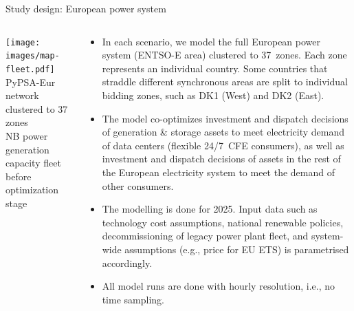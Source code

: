 \begin{frame}{Study design: European power system}
  
  {\footnotesize
  \begin{columns}[T]

  \begin{column}{7cm}
  \centering
  \vspace{0.5cm}
  \texttt{[image: images/map-fleet.pdf]}
  {\scriptsize   PyPSA-Eur network clustered to 37 zones \\ 
  NB power generation capacity fleet before optimization stage}
  \end{column}

  \begin{column}{8cm}
  \begin{itemize}
  \vspace{-0.2cm}
  \item In each scenario, we model the full European power system (ENTSO-E area) 
  clustered to \alert{37~zones}. Each zone represents an individual country. Some countries
  that straddle different synchronous areas are split to individual bidding zones, 
  such as DK1 (West) and DK2 (East).

  \item The model \alert{co-optimizes} investment and dispatch decisions of generation \& storage assets to meet electricity demand of data centers (flexible 24/7~CFE consumers), as well as investment and dispatch decisions of assets in the rest of the European electricity system to meet the demand of other consumers. 
  
  \item The modelling is done for \alert{2025}. Input data such as technology cost assumptions,
  national renewable policies, decommissioning of legacy power plant fleet, and system-wide assumptions (e.g., price for EU ETS) is parametrised accordingly.

  \item All model runs are done with \alert{hourly resolution}, i.e., no time sampling.
  
  \end{itemize}

  \end{column}
  \end{columns}
  }

\end{frame}



